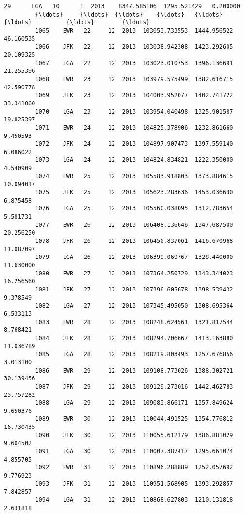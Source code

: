 \documentclass[11pt]{article}
\begin{document}
\begin{Verbatim}[commandchars=\\\{\}]
         29      LGA   10      1  2013    8347.585106  1295.521429   0.200000   
         {\ldots}     {\ldots}  {\ldots}    {\ldots}   {\ldots}            {\ldots}          {\ldots}        {\ldots}   
         1065    EWR   22     12  2013  103053.733553  1444.956522  46.160535   
         1066    JFK   22     12  2013  103038.942308  1423.292605  20.109325   
         1067    LGA   22     12  2013  103023.010753  1396.136691  21.255396   
         1068    EWR   23     12  2013  103979.575499  1382.616715  42.590778   
         1069    JFK   23     12  2013  104003.952077  1402.741722  33.341060   
         1070    LGA   23     12  2013  103954.040498  1325.901587  19.825397   
         1071    EWR   24     12  2013  104825.378906  1232.861660   9.450593   
         1072    JFK   24     12  2013  104897.907473  1397.559140   6.086022   
         1073    LGA   24     12  2013  104824.834821  1222.350000   4.540909   
         1074    EWR   25     12  2013  105583.918803  1373.884615  10.094017   
         1075    JFK   25     12  2013  105623.283636  1453.036630   6.875458   
         1076    LGA   25     12  2013  105560.038095  1312.783654   5.581731   
         1077    EWR   26     12  2013  106408.136646  1347.687500  20.256250   
         1078    JFK   26     12  2013  106450.837061  1416.670968  11.087097   
         1079    LGA   26     12  2013  106399.069767  1328.440000  11.630000   
         1080    EWR   27     12  2013  107364.250729  1343.344023  16.256560   
         1081    JFK   27     12  2013  107396.605678  1398.539432   9.378549   
         1082    LGA   27     12  2013  107345.495050  1308.695364   6.533113   
         1083    EWR   28     12  2013  108248.624561  1321.817544   8.768421   
         1084    JFK   28     12  2013  108294.706667  1413.163880  11.036789   
         1085    LGA   28     12  2013  108219.803493  1257.676856   3.013100   
         1086    EWR   29     12  2013  109108.773026  1388.302721  30.139456   
         1087    JFK   29     12  2013  109129.273016  1442.462783  25.757282   
         1088    LGA   29     12  2013  109083.866171  1357.849624   9.650376   
         1089    EWR   30     12  2013  110044.491525  1354.776812  16.730435   
         1090    JFK   30     12  2013  110055.612179  1386.881029   9.604502   
         1091    LGA   30     12  2013  110007.387417  1295.661074   4.855705   
         1092    EWR   31     12  2013  110896.288889  1252.057692   9.776923   
         1093    JFK   31     12  2013  110951.568905  1393.292857   7.842857   
         1094    LGA   31     12  2013  110868.627803  1210.131818   2.631818   
         

\end{Verbatim}
\end{document}
